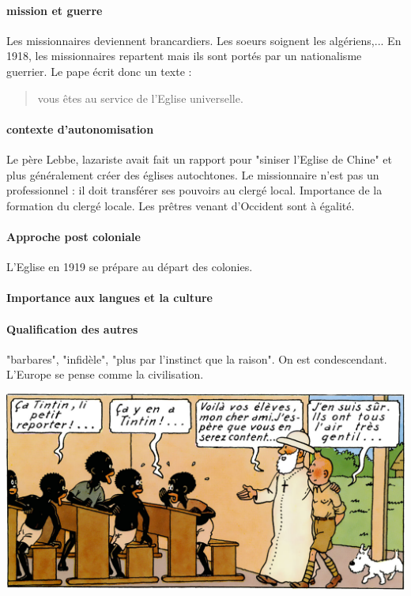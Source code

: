 \paragraph{mission et guerre} Les missionnaires deviennent brancardiers. Les soeurs soignent les algériens,... En 1918, les missionnaires repartent mais ils sont portés par un nationalisme guerrier.
Le pape écrit donc un texte :
\begin{quote}
    vous êtes au service de l'Eglise universelle. 
\end{quote}

\paragraph{contexte d'autonomisation}
Le père Lebbe, lazariste avait fait un rapport pour "siniser l'Eglise de Chine" et plus généralement créer des églises autochtones.
Le missionnaire n'est pas un professionnel : il doit transférer ses pouvoirs au clergé local. 
Importance de la formation du clergé locale. Les prêtres venant d'Occident sont à égalité.

\paragraph{Approche post coloniale} L'Eglise en 1919 se prépare au départ des colonies.

\paragraph{Importance aux langues et la culture}


\paragraph{Qualification des autres} "barbares", "infidèle", "plus par l'instinct que la raison". On est condescendant. L'Europe se pense comme la civilisation. 


\includegraphics[width=\textwidth]{SeminaireMission/images/TintinCongo.jpg}

